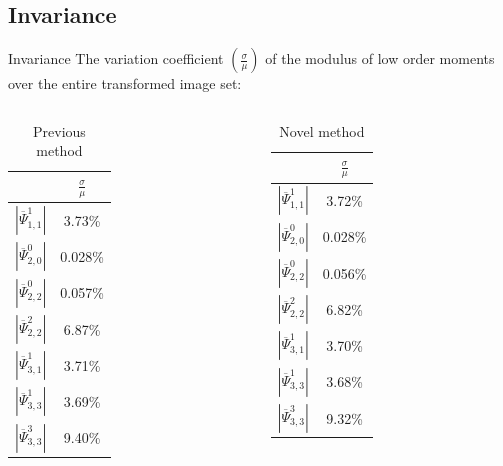 \documentclass{beamer}
\begin{document}
\subsection{Invariance}
\begin{frame}{Invariance}
    \vskip 10mm
The variation coefficient $\left(\frac{\sigma}{\mu}\right)$ of the modulus of low order moments over the entire transformed image set:
\begin{columns}
    \begin{column}{.5\textwidth}
        \begin{table}
            \centering
        \begin{tabular}{| c | c | } \hline
        & $\frac{\sigma}{\mu}$ \\ \hline\hline
        $|\overline{\Psi}_{1,1}^1|$ & 3.73\% \\ \hline
        $|\overline{\Psi}_{2,0}^0|$ & 0.028\% \\ \hline
        $|\overline{\Psi}_{2,2}^0|$ & 0.057\% \\ \hline
        $|\overline{\Psi}_{2,2}^2|$ & 6.87\% \\ \hline
        $|\overline{\Psi}_{3,1}^1|$ & 3.71\%  \\ \hline
        $|\overline{\Psi}_{3,3}^1|$ & 3.69\% \\ \hline
        $|\overline{\Psi}_{3,3}^3|$ & 9.40\% \\ \hline
        \end{tabular}
        \caption{Previous method}
        \end{table}
    \end{column}
    \begin{column}{.5\textwidth}
        \begin{table}
            \centering
        \begin{tabular}{| c | c | } \hline
        & $\frac{\sigma}{\mu}$ \\ \hline\hline
        $|\overline{\Psi}_{1,1}^1|$ & 3.72\% \\ \hline
        $|\overline{\Psi}_{2,0}^0|$ & 0.028\%\\ \hline
        $|\overline{\Psi}_{2,2}^0|$ & 0.056\%\\ \hline
        $|\overline{\Psi}_{2,2}^2|$ & 6.82\%\\ \hline
        $|\overline{\Psi}_{3,1}^1|$ & 3.70\%\\ \hline
        $|\overline{\Psi}_{3,3}^1|$ & 3.68\%\\ \hline
        $|\overline{\Psi}_{3,3}^3|$ & 9.32\%\\ \hline
        \end{tabular}
        \caption{Novel method}
        \end{table}
    \end{column}
\end{columns}
\end{frame}
\end{document}
